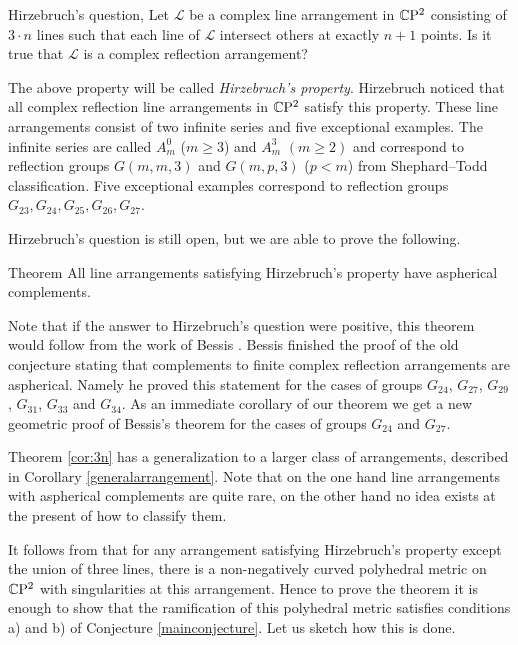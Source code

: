 \documentclass[oneside,a4paper]{article}
\begin{document}
\begin{thm}{Hirzebruch's question, \cite{Hirzebruch}} Let  $\mathcal{L}$ be a complex line arrangement in $\mathbb{C}\mathrm{P}^2$ consisting of $3\cdot n$ lines such that each line of $\mathcal{L}$ intersect others at exactly $n+1$ points. 
Is it true that $\mathcal{L}$ is a complex reflection arrangement?
\end{thm}
The above property will be called {\it Hirzebruch's property}.
Hirzebruch noticed that all complex reflection line arrangements in $\mathbb{C}\mathrm{P}^2$ satisfy this property. These line arrangements consist of two infinite series and five exceptional examples. 
The infinite series are called $A_m^0$ ($m\ge 3$) and $A_m^3$ $(m\ge 2)$ and correspond to reflection groups $G(m,m,3)$ and $G(m,p,3)$ ($p<m$) from Shephard--Todd classification. 
Five  exceptional examples correspond to reflection groups $G_{23}, G_{24}, G_{25}, G_{26}, G_{27}$. 

Hirzebruch's question is still open, but we are able to prove the following.

\begin{thm}{Theorem}\label{cor:3n}
All line arrangements satisfying Hirzebruch's property have aspherical complements.
\end{thm}

Note that if the answer to Hirzebruch's question were positive, this theorem would follow from 
the work of Bessis \cite{bessis}. 
Bessis finished the proof of the old conjecture stating that complements to finite complex reflection arrangements are aspherical. 
Namely he proved this statement for the cases of groups  $G_{24}$, $G_{27}$, $G_{29}$, $G_{31}$, $G_{33}$ and $G_{34}$. 
As an immediate corollary of our theorem we get a new geometric proof of Bessis's theorem for the cases of groups  $G_{24}$ and $G_{27}$.

Theorem \ref{cor:3n} has a generalization to a larger class of arrangements, described in Corollary \ref{generalarrangement}. 
Note that on the one hand line arrangements with aspherical complements are quite rare, on the other hand no idea exists at the present of how to classify them.  


It follows from \cite[Corollary 7.8]{panov}
that for any arrangement satisfying Hirzebruch's property except the union of three lines, there is a non-negatively curved polyhedral metric on $\mathbb{C}\mathrm{P}^2$ with singularities at this arrangement. Hence to prove the theorem it is enough to show that the ramification of this polyhedral metric satisfies conditions a) and b) of Conjecture \ref{mainconjecture}.  Let us sketch how this is done.
\end{document}

